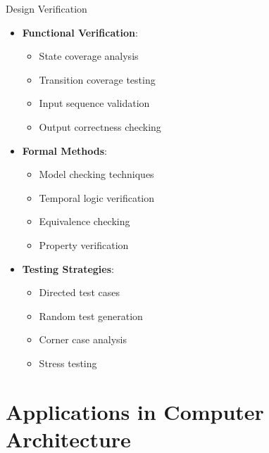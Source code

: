 \documentclass[aspectratio=169,11pt]{beamer}
\newcommand{\concept}[1]{\textbf{\color{accentcolor}#1}}
\begin{document}
\begin{frame}{Design Verification}
\begin{itemize}
\item \concept{Functional Verification}:
\begin{itemize}
\item State coverage analysis
\item Transition coverage testing
\item Input sequence validation
\item Output correctness checking
\end{itemize}
\vspace{0.5cm}
\item \concept{Formal Methods}:
\begin{itemize}
\item Model checking techniques
\item Temporal logic verification
\item Equivalence checking
\item Property verification
\end{itemize}
\vspace{0.3cm}
\item \concept{Testing Strategies}:
\begin{itemize}
\item Directed test cases
\item Random test generation
\item Corner case analysis
\item Stress testing
\end{itemize}
\end{itemize}
\end{frame}

\section{Applications in Computer Architecture}
\end{document}
